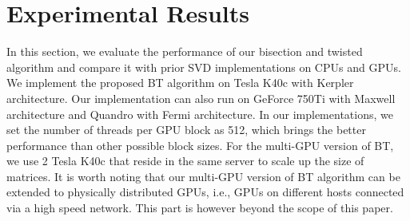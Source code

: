 \vspace{-0.1in}
\section{Experimental Results} \label{sec:results}
\vspace{-0.1in}
In this section, we evaluate the performance of our bisection and twisted algorithm and compare it with prior SVD implementations on CPUs and GPUs.
We implement the proposed BT algorithm on Tesla K40c with Kerpler architecture. 
Our implementation can also run on GeForce 750Ti with Maxwell architecture and Quandro with Fermi architecture.
In our implementations, we set the number of threads per GPU block as 512, which brings the better performance than other possible block sizes.
For the multi-GPU version of BT, we use 2 Tesla K40c that reside in the same server to scale up the size of matrices. 
It is worth noting that our multi-GPU version of BT algorithm can be extended to physically distributed GPUs, i.e., GPUs on different hosts connected via a high speed network. 
This part is however beyond the scope of this paper. 

